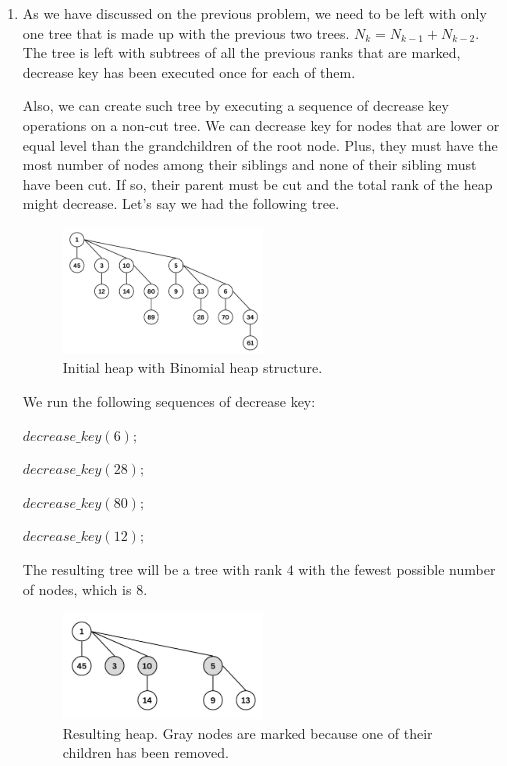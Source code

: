 \documentclass{article}
\begin{document}
\begin{enumerate}
  \item As we have discussed on the previous problem, we need to be left with only one tree that is made up with the previous two trees.
  $N_k=N_{k-1}+N_{k-2}$. The tree is left with subtrees of all the previous ranks that are marked, decrease key has been executed
  once for each of them.

  Also, we can create such tree by executing a sequence of decrease key operations on a non-cut tree. We can decrease key for nodes that are lower or equal level than the grandchildren of the root node.
  Plus, they must have the most number of nodes among their siblings and none of their sibling must have been cut. If so, their parent must be cut and the total rank of the heap might decrease.
  Let's say we had the following tree.
  \begin{figure}[H]
    \centering
    \includegraphics[width=0.5\textwidth]{image3.png}
    \caption{Initial heap with Binomial heap structure.}
  \end{figure}

  We run the following sequences of decrease key:

  $decrease\_key(6);$

  $decrease\_key(28);$

  $decrease\_key(80);$

  $decrease\_key(12);$

  The resulting tree will be a tree with rank $4$ with the fewest possible number of nodes, which is $8$.
  \begin{figure}[H]
    \centering
    \includegraphics[width=0.5\textwidth]{image4.png}
    \caption{Resulting heap. Gray nodes are marked because one of their children has been removed.}
  \end{figure}


\end{enumerate}
\end{document}
